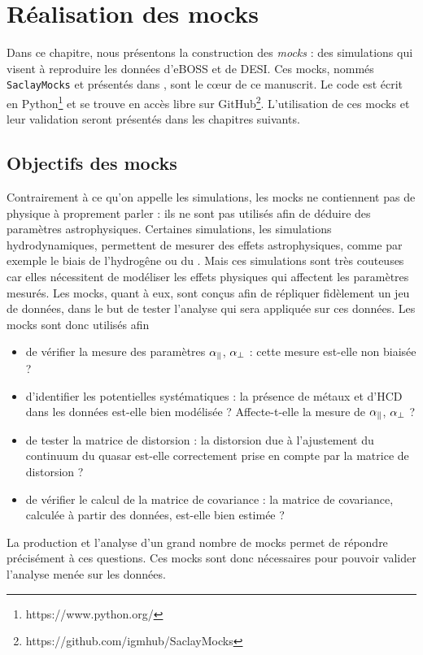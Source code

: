 \documentclass[11pt, twoside, a4paper, openright]{report}
\begin{document}

\graphicspath{ {../figures/mocks/} }

\chapter{Réalisation des mocks}
\minitoc
\newpage
\thispagestyle{fancy}

Dans ce chapitre, nous présentons la construction des \emph{mocks} : des simulations qui visent à reproduire les données d'eBOSS et de DESI. Ces mocks, nommés \texttt{SaclayMocks} et présentés dans \citet{CITE:mocks}, sont le c{\oe}ur de ce manuscrit. Le code est écrit en Python\footnote{https://www.python.org/} et se trouve en accès libre sur GitHub\footnote{https://github.com/igmhub/SaclayMocks}. L'utilisation de ces mocks et leur validation seront présentés dans les chapitres suivants.

\section{Objectifs des mocks}
Contrairement à ce qu'on appelle les simulations, les mocks ne contiennent pas de physique à proprement parler : ils ne sont pas utilisés afin de déduire des paramètres astrophysiques. Certaines simulations, les simulations hydrodynamiques, permettent de mesurer des effets astrophysiques, comme par exemple le biais de l'hydrogêne ou du \lya{}. Mais ces simulations sont très couteuses car elles nécessitent de modéliser les effets physiques qui affectent les paramètres mesurés.
Les mocks, quant à eux, sont conçus afin de répliquer fidèlement un jeu de données, dans le but de tester l'analyse qui sera appliquée sur ces données.
Les mocks sont donc utilisés afin
\begin{itemize}[label=$\bullet$]
\item de vérifier la mesure des paramètres $\alpha_{\parallel}{}$, $\alpha_{\perp}{}$ : cette mesure est-elle non biaisée ?
\item d'identifier les potentielles systématiques : la présence de métaux et d'HCD dans les données est-elle bien modélisée ? Affecte-t-elle la mesure de $\alpha_{\parallel}{}$, $\alpha_{\perp}{}$ ?
\item de tester la matrice de distorsion : la distorsion due à l'ajustement du continuum du quasar est-elle correctement prise en compte par la matrice de distorsion ?
\item de vérifier le calcul de la matrice de covariance : la matrice de covariance, calculée à partir des données, est-elle bien estimée ?
\end{itemize}
La production et l'analyse d'un grand nombre de mocks permet de répondre précisément à ces questions. Ces mocks sont donc nécessaires pour pouvoir valider l'analyse menée sur les données.
\end{document}
